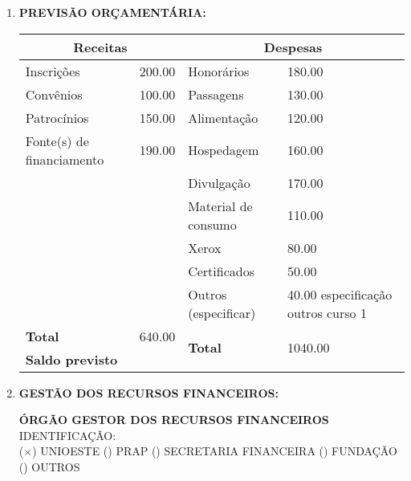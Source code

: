 \documentclass[12pt,a4paper,oneside]{article}%
\begin{document}
\begin{enumerate}
{\begin{mdframed}[innertopmargin=5pt, innerleftmargin=3pt, innerrightmargin=3pt, topline=false]
\newline%
\end{mdframed}%
}%
\item%
\textbf{PREVISÃO ORÇAMENTÁRIA: }%
\newline%
\begin{tabularx}{\linewidth}{|X|X|X|X|}%
\hline%
\multicolumn{2}{|c|}{\textbf{Receitas}}&\multicolumn{2}{c|}{\textbf{Despesas}}\\%
\hline%
Inscrições&200.00&Honorários&180.00\\%
\hline%
Convênios&100.00&Passagens&130.00\\%
\hline%
Patrocínios&150.00&Alimentação&120.00\\%
\hline%
Fonte(s) de financiamento&190.00&Hospedagem&160.00\\%
\hline%
&&Divulgação&170.00\\%
\hline%
&&Material de consumo&110.00\\%
\hline%
&&Xerox&80.00\\%
\hline%
&&Certificados&50.00\\%
\hline%
&&Outros (especificar)&40.00\newline%
especificação outros curso 1\\%
\hline%
\textbf{Total}&640.00&\multirow{2}{*}{\textbf{Total}}&\multirow{2}{*}{1040.00}\\%
\cline{1-2}%
\textbf{Saldo previsto}&&&\\%
\hline%
\end{tabularx}%
\item%
\textbf{GESTÃO DOS RECURSOS FINANCEIROS: }%
\newline%
\begin{mdframed}[innertopmargin=5pt, innerleftmargin=3pt, innerrightmargin=3pt]%
\textbf{ÓRGÃO GESTOR DOS RECURSOS FINANCEIROS }%
\newline%
IDENTIFICAÇÃO: \\%
($\times$) UNIOESTE%
\newline%
() PRAP%
\newline%
() SECRETARIA FINANCEIRA%
\newline%
() FUNDAÇÃO%
\newline%
() OUTROS%
\newline%
\end{mdframed}%
\end{enumerate}%
\end{document}
